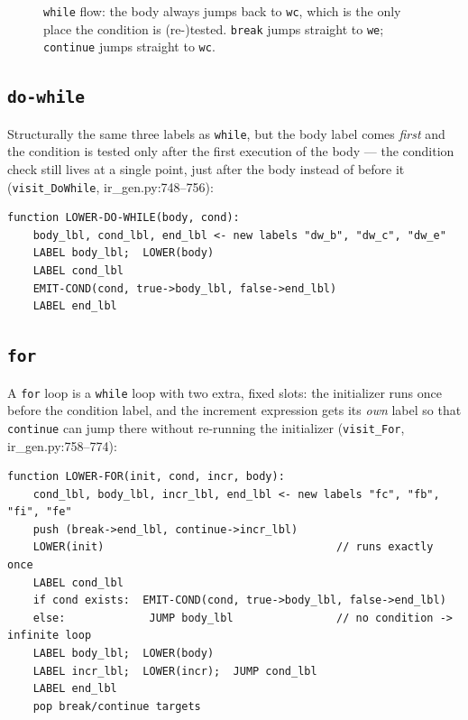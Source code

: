 \documentclass[11pt,a4paper]{article}
\begin{document}
\begin{figure}[h]
\centering
{}
\caption{\texttt{while} flow: the body always jumps back to \texttt{wc}, which is the
only place the condition is (re-)tested. \texttt{break} jumps straight to \texttt{we};
\texttt{continue} jumps straight to \texttt{wc}.}
\end{figure}

\subsection*{\texttt{do-while}}
Structurally the same three labels as \texttt{while}, but the body label comes
\emph{first} and the condition is tested only after the first execution of the body ---
the condition check still lives at a single point, just after the body instead of before
it (\texttt{visit\_DoWhile}, ir\_gen.py:748--756):
\begin{lstlisting}[style=pseudostyle]
function LOWER-DO-WHILE(body, cond):
    body_lbl, cond_lbl, end_lbl <- new labels "dw_b", "dw_c", "dw_e"
    LABEL body_lbl;  LOWER(body)
    LABEL cond_lbl
    EMIT-COND(cond, true->body_lbl, false->end_lbl)
    LABEL end_lbl
\end{lstlisting}

\subsection*{\texttt{for}}
A \texttt{for} loop is a \texttt{while} loop with two extra, fixed slots: the
initializer runs once before the condition label, and the increment expression gets its
\emph{own} label so that \texttt{continue} can jump there without re-running the
initializer (\texttt{visit\_For}, ir\_gen.py:758--774):
\begin{lstlisting}[style=pseudostyle]
function LOWER-FOR(init, cond, incr, body):
    cond_lbl, body_lbl, incr_lbl, end_lbl <- new labels "fc", "fb", "fi", "fe"
    push (break->end_lbl, continue->incr_lbl)
    LOWER(init)                                    // runs exactly once
    LABEL cond_lbl
    if cond exists:  EMIT-COND(cond, true->body_lbl, false->end_lbl)
    else:             JUMP body_lbl                // no condition -> infinite loop
    LABEL body_lbl;  LOWER(body)
    LABEL incr_lbl;  LOWER(incr);  JUMP cond_lbl
    LABEL end_lbl
    pop break/continue targets
\end{lstlisting}
\end{document}
